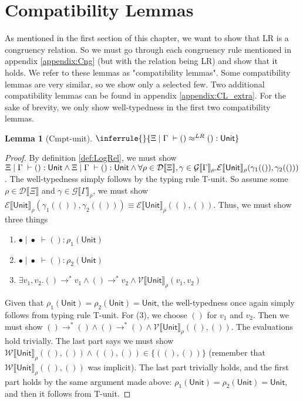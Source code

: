 \documentclass[a4paper, 11pt]{report}
\newtheorem{lemma}[theorem]{Lemma}
\theoremstyle{definition}
\newcommand{\val}{v}
\newcommand{\TT}{()}
\newcommand{\Tunit}{\mathsf{Unit}}
\newcommand{\venv}{\Gamma}
\newcommand{\tenv}{\Xi}
\newcommand{\emptenv}{\bullet}
\newcommand{\empvenv}{\bullet}
\newcommand{\jdg}[4]{#1 \; | \; #2 \; \vdash #3 : #4}
\newcommand{\jdgRel}[6]{#1 \; | \; #2 \; \vdash #3 \approx^{#4} #5 : #6}
\newcommand{\stepS}{\rightarrow^*}
\newcommand{\WtInp}[2]{\mathcal{W} \llbracket #1 \rrbracket_{#2}}
\newcommand{\ValInp}[2]{\mathcal{V} \llbracket #1 \rrbracket_{#2}}
\newcommand{\ExpInp}[2]{\mathcal{E} \llbracket #1 \rrbracket_{#2}}
\newcommand{\VenvInp}[2]{\mathcal{G} \llbracket #1 \rrbracket_{#2}}
\newcommand{\TenvInp}[1]{\mathcal{D} \llbracket #1 \rrbracket}
\newcommand{\LogRel}[5]{\jdgRel{#1}{#2}{#3}{LR}{#4}{#5}}
\begin{document}
\section{Compatibility Lemmas}
As mentioned in the first section of this chapter, we want to show that LR is a congruency relation. So we must go through each congruency rule mentioned in appendix \ref{appendix:Cng} (but with the relation being LR) and show that it holds. We refer to these lemmas as "compatibility lemmas". Some compatibility lemmas are very similar, so we show only a selected few. Two additional compatibility lemmas can be found in appendix \ref{appendix:CL_extra}. For the sake of brevity, we only show well-typedness in the first two compatibility lemmas.
\begin{lemma}[Cmpt-unit]
  $\inferrule{ }{\LogRel{\tenv}{\venv}{\TT}{\TT}{\Tunit}}$
\end{lemma}
\begin{proof}
  By definition \ref*{def:LogRel}, we must show $\jdg{\tenv}{\venv}{\TT}{\Tunit} \land \jdg{\tenv}{\venv}{\TT}{\Tunit} \land\\ \forall \rho \in \TenvInp{\tenv}, \gamma \in \VenvInp{\venv}{\rho} . 
  \ExpInp{\Tunit}{\rho}(\gamma_1(\TT), \gamma_2(\TT))$. The well-typedness simply follows by the typing rule T-unit.
  So assume some $\rho \in \TenvInp{\tenv}$ and $\gamma \in \VenvInp{\venv}{\rho}$, we must show $\ExpInp{\Tunit}{\rho}(\gamma_1(\TT), \gamma_2(\TT)) \equiv \ExpInp{\Tunit}{\rho}(\TT, \TT)$. Thus, we must show three things
  \begin{enumerate}
    \item $\jdg{\emptenv}{\empvenv}{\TT}{\rho_1(\Tunit)}$
    \item $\jdg{\emptenv}{\empvenv}{\TT}{\rho_2(\Tunit)}$
    \item $\exists \val_1, \val_2 . \TT \stepS \val_1 \land \TT \stepS \val_2 \land \ValInp{\Tunit}{\rho}(\val_1, \val_2)$
  \end{enumerate}
  Given that $\rho_1(\Tunit) = \rho_2(\Tunit) = \Tunit$, the well-typedness once again simply follows from typing rule T-unit. For (3), we choose $\TT$ for $\val_1$ and $\val_2$. Then we must show $\TT \stepS \TT \land \TT \stepS \TT \land \ValInp{\Tunit}{\rho}(\TT, \TT)$. The evaluations hold trivially. The last part says we must show $\WtInp{\Tunit}{\rho}(\TT, \TT) \land (\TT, \TT) \in \{(\TT, \TT)\}$ (remember that $\WtInp{\Tunit}{\rho}(\TT, \TT)$ was implicit). The last part trivially holds, and the first part holds by the same argument made above: $\rho_1(\Tunit) = \rho_2(\Tunit) = \Tunit$, and then it follows from T-unit. 
\end{proof}
\end{document}
